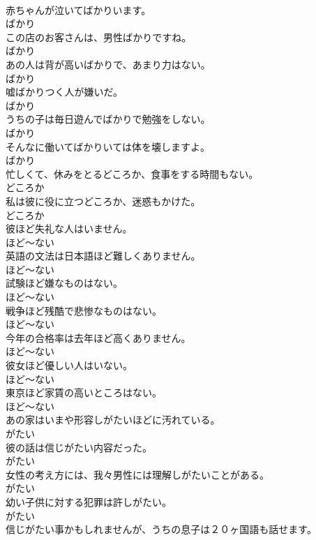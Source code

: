 \documentclass[8pt]{extreport}
\begin{document}
\begin{CJK}{UTF8}{min}
\\	赤ちゃんが泣いてばかりいます。	
\\	ばかり
\\	この店のお客さんは、男性ばかりですね。	
\\	ばかり
\\	あの人は背が高いばかりで、あまり力はない。	
\\	ばかり
\\	嘘ばかりつく人が嫌いだ。	
\\	ばかり
\\	うちの子は毎日遊んでばかりで勉強をしない。	
\\	ばかり
\\	そんなに働いてばかりいては体を壊しますよ。	
\\	ばかり
\\	忙しくて、休みをとるどころか、食事をする時間もない。	
\\	どころか
\\	私は彼に役に立つどころか、迷惑もかけた。	
\\	どころか
\\	彼ほど失礼な人はいません。	
\\	ほど～ない
\\	英語の文法は日本語ほど難しくありません。	
\\	ほど～ない
\\	試験ほど嫌なものはない。	
\\	ほど～ない
\\	戦争ほど残酷で悲惨なものはない。	
\\	ほど～ない
\\	今年の合格率は去年ほど高くありません。	
\\	ほど～ない
\\	彼女ほど優しい人はいない。	
\\	ほど～ない
\\	東京ほど家賃の高いところはない。	
\\	ほど～ない
\\	あの家はいまや形容しがたいほどに汚れている。	
\\	がたい
\\	彼の話は信じがたい内容だった。	
\\	がたい
\\	女性の考え方には、我々男性には理解しがたいことがある。	
\\	がたい
\\	幼い子供に対する犯罪は許しがたい。	
\\	がたい
\\	信じがたい事かもしれませんが、うちの息子は２０ヶ国語も話せます。	

\end{CJK}
\end{document}
